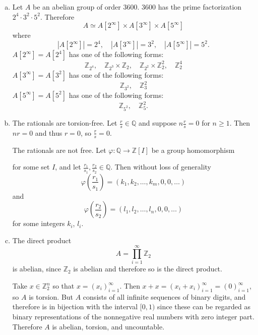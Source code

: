 \documentclass{article}
\begin{document}
\begin{Answer}
\begin{enumerate}[(a)]
  \item{
    Let $A$ be an abelian group of order 3600.
    3600 has the prime factorization $2^4 \cdot 3^2 \cdot
    5^2$. Therefore
    $$
    A \simeq A[2^\infty] \times A[3^\infty] \times A[5^\infty]
    $$
    where
    $$
    |A[2^\infty]| = 2^4, \quad
    |A[3^\infty]| = 3^2, \quad
    |A[5^\infty]| = 5^2.
    $$
    $A[2^\infty] = A[2^4]$ has one of the following forms:
    $$
    \mathbb{Z}_{2^4}, \quad
    \mathbb{Z}_{2^3} \times \mathbb{Z}_{2}, \quad
    \mathbb{Z}_{2^2} \times \mathbb{Z}_{2}^2, \quad
    \mathbb{Z}_{2}^4
    $$
    $A[3^\infty] = A[3^2]$ has one of the following forms:
    $$
    \mathbb{Z}_{3^2}, \quad \mathbb{Z}_{3}^2
    $$
    $A[5^\infty] = A[5^2]$ has one of the following forms:
    $$
    \mathbb{Z}_{5^2}, \quad \mathbb{Z}_{5}^2.
    $$


  }
  \item{
    The rationals are torsion-free. Let $\frac{r}{s} \in
    \mathbb{Q}$ and suppose $n \frac{r}{s} = 0$ for $n \geq 1$.
    Then $n r = 0$ and thus $r = 0$, so $\frac{r}{s} = 0$.

    The rationals are not free. Let
    $\varphi : \mathbb{Q} \to \mathbb{Z}[I]$ be a group homomorphism

    for some set $I$, and let $\frac{r_1}{s_1}, \frac{r_2}{s_2} \in
    \mathbb{Q}$. Then without loss of generality
    $$
    \varphi\left(\frac{r_1}{s_1}\right) =
      (k_1, k_2, \dots, k_m, 0, 0, \dots)
    $$
    and
    $$
    \varphi\left(\frac{r_2}{s_2}\right) =
      (l_1, l_2, \dots, l_n, 0, 0, \dots)
    $$
    for some integers $k_i$, $l_i$.
  }
  \item{
    The direct product
    $$
    A = \prod_{i=1}^\infty \mathbb{Z}_2
    $$
    is abelian, since $\mathbb{Z}_2$ is abelian and therefore so is
    the direct product.

    Take $x \in \mathbb{Z}_2^n$ so that $x = (x_i)_{i=1}^\infty$. Then
    $x + x = (x_i + x_i)_{i=1}^\infty = (0)_{i=1}^\infty$, so $A$ is torsion.
    But $A$ consists of all infinite sequences of binary digits, and
    therefore is in bijection with the interval $[0, 1)$ since these
    can be regarded as binary representations of the nonnegative real
    numbers with zero integer part.
    Therefore $A$ is abelian, torsion, and uncountable.
  }
\end{enumerate}
\end{Answer}
\end{document}
